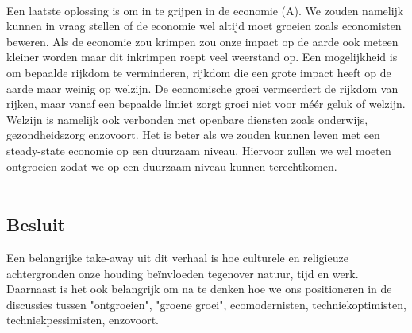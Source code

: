 \documentclass[../summary.tex]{subfiles}
\begin{document}
	 \\
	 Een laatste oplossing is om in te grijpen in de economie (A). We zouden namelijk kunnen in vraag stellen of de economie wel altijd moet groeien zoals economisten beweren. Als de economie zou krimpen zou onze impact op de aarde ook meteen kleiner worden maar dit inkrimpen roept veel weerstand op. Een mogelijkheid is om bepaalde rijkdom te verminderen, rijkdom die een grote impact heeft op de aarde maar weinig op welzijn. De economische groei vermeerdert de rijkdom van rijken, maar vanaf een bepaalde limiet zorgt groei niet voor méér geluk of welzijn. Welzijn is namelijk ook verbonden met openbare diensten zoals onderwijs, gezondheidszorg enzovoort. Het is beter als we zouden kunnen leven met een steady-state economie op een duurzaam niveau. Hiervoor zullen we wel moeten ontgroeien zodat we op een duurzaam niveau kunnen terechtkomen.\\
	 \\
	 \subsection{Besluit}
	 Een belangrijke take-away uit dit verhaal is hoe culturele en religieuze achtergronden onze houding beïnvloeden tegenover natuur, tijd en werk. Daarnaast is het ook belangrijk om na te denken hoe we ons positioneren in de discussies tussen "ontgroeien", "groene groei", ecomodernisten, techniekoptimisten, techniekpessimisten, enzovoort.
	
\end{document}
